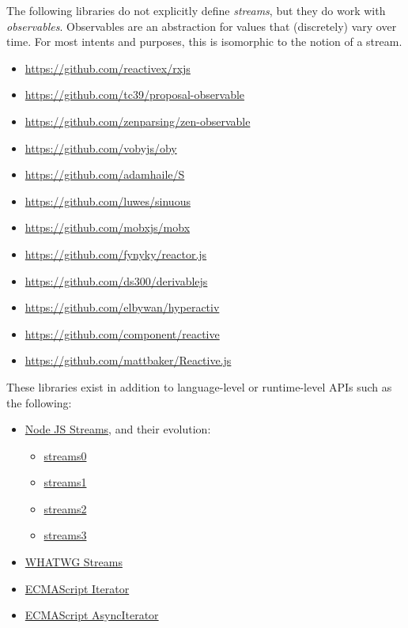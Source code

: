 \documentclass[sigplan,screen,10pt,anonymous,review]{acmart}
\begin{document}
The following libraries do not explicitly define \textit{streams}, but they do work with \textit{observables}. Observables are an abstraction for values that (discretely) vary over time. For most intents and purposes, this is isomorphic to the notion of a stream.

\begin{itemize}
    \item \url{https://github.com/reactivex/rxjs}
    \item \url{https://github.com/tc39/proposal-observable}
    \item \url{https://github.com/zenparsing/zen-observable}
    \item \url{https://github.com/vobyjs/oby}
    \item \url{https://github.com/adamhaile/S}
    \item \url{https://github.com/luwes/sinuous}
    \item \url{https://github.com/mobxjs/mobx}
    \item \url{https://github.com/fynyky/reactor.js}
    \item \url{https://github.com/ds300/derivablejs}
    \item \url{https://github.com/elbywan/hyperactiv}
    \item \url{https://github.com/component/reactive}
    \item \url{https://github.com/mattbaker/Reactive.js}
\end{itemize}

These libraries exist in addition to language-level or runtime-level APIs such as the following:

\begin{itemize}
    \item \href{https://nodejs.org/api/stream.html}{Node JS Streams}, and their evolution: \begin{itemize}
        \item \href{https://nodejs.org/docs/v0.1.100/api.html}{streams0}
        \item \href{https://nodejs.org/docs/v0.4.0/api/streams.html}{streams1}
        \item \href{https://nodejs.org/docs/v0.10.0/api/stream.html}{streams2}
        \item \href{https://nodejs.org/docs/v0.11.5/api/stream.html}{streams3}
    \end{itemize}
    \item \href{https://streams.spec.whatwg.org/}{WHATWG Streams}
    \item \href{https://tc39.es/ecma262/multipage/control-abstraction-objects.html#sec-%iteratorprototype%-object}{ECMAScript Iterator}
    \item \href{https://tc39.es/ecma262/multipage/control-abstraction-objects.html#sec-asynciteratorprototype}{ECMAScript AsyncIterator}
\end{itemize}



\end{document}
